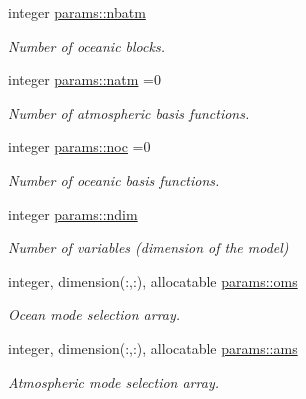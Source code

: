 \begin{DoxyCompactItemize}
integer \hyperlink{namespaceparams_aa5dc201b0a59d8bb25a5dc52d2ed3cac}{params\+::nbatm}
\begin{DoxyCompactList}\small\item\em Number of oceanic blocks. \end{DoxyCompactList}\item 
integer \hyperlink{namespaceparams_a4f46551b6a8ad183d2dced1da3dc5fed}{params\+::natm} =0
\begin{DoxyCompactList}\small\item\em Number of atmospheric basis functions. \end{DoxyCompactList}\item 
integer \hyperlink{namespaceparams_acdb6ef89bcada9ba7b6b6bba575b60f4}{params\+::noc} =0
\begin{DoxyCompactList}\small\item\em Number of oceanic basis functions. \end{DoxyCompactList}\item 
integer \hyperlink{namespaceparams_a2323fe1773f086e20c14f266351c482b}{params\+::ndim}
\begin{DoxyCompactList}\small\item\em Number of variables (dimension of the model) \end{DoxyCompactList}\item 
integer, dimension(\+:,\+:), allocatable \hyperlink{namespaceparams_a5e25e072992d5908eea5308243b7ec63}{params\+::oms}
\begin{DoxyCompactList}\small\item\em Ocean mode selection array. \end{DoxyCompactList}\item 
integer, dimension(\+:,\+:), allocatable \hyperlink{namespaceparams_aa95299f1a9c54693b85e049004369089}{params\+::ams}
\begin{DoxyCompactList}\small\item\em Atmospheric mode selection array. \end{DoxyCompactList}\end{DoxyCompactItemize}

